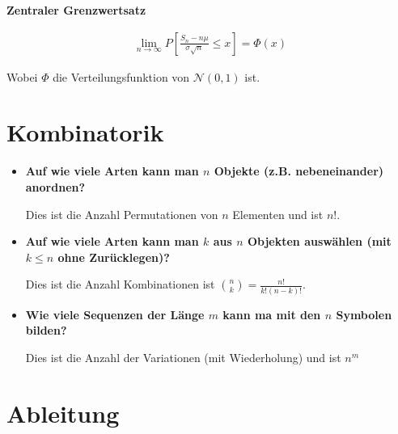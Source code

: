 \documentclass[25pt]{sciposter}
\newenvironment{method}[1]{\begin{mdframed}[backgroundcolor=blue!10,innertopmargin=15pt, innerbottommargin=15pt,nobreak=true]
		\textbf{#1 }
	}
	{ 
	\end{mdframed}
}
\begin{document}
\begin{multicols}{3}
\begin{method}{Zentraler Grenzwertsatz}
	\begin{align*}
		\lim\limits_{n \to \infty} P\left[ \frac{S_n - n\mu}{\sigma \sqrt{n}} \leq x\right] = \Phi(x)
	\end{align*}

	Wobei $\Phi$ die Verteilungsfunktion von $\mathcal{N}(0,1)$ ist.	
\end{method}




\section {Kombinatorik}

\begin{itemize}
	\item \textbf{Auf wie viele Arten kann man $n$ Objekte (z.B. nebeneinander) anordnen?}
	
	Dies ist die Anzahl Permutationen von $n$ Elementen und ist $n!$.
	
	
	\item 	\textbf{Auf wie viele Arten kann man $k$ aus $n$ Objekten auswählen (mit $k\leq n$ ohne Zurücklegen)?}
	
	Dies ist die Anzahl Kombinationen ist $\binom{n}{k} = \frac{n!}{k!(n-k)!}$.
	
	
	\item \textbf{Wie viele Sequenzen der Länge $m$ kann ma mit den $n$ Symbolen bilden?}
	
	Dies ist die Anzahl der Variationen (mit Wiederholung) und ist $n^m$
\end{itemize}




\vfill


\newpage













\section{Ableitung}


\end{multicols}
\end{document}
